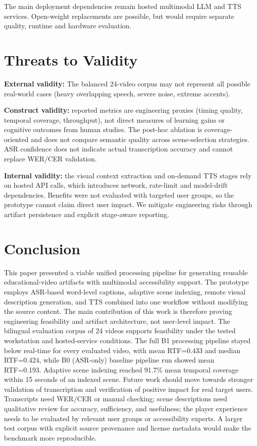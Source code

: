 ﻿\documentclass[conference]{IEEEtran}
\begin{document}
The main deployment dependencies remain hosted multimodal LLM and TTS services. Open-weight replacements are possible, but would require separate quality, runtime and hardware evaluation.

\section{Threats to Validity}
\textbf{External validity:} The balanced 24-video corpus may not represent all possible real-world cases (heavy overlapping speech, severe noise, extreme accents).

\textbf{Construct validity:} reported metrics are engineering proxies (timing quality, temporal coverage, throughput), not direct measures of learning gains or cognitive outcomes from human studies. The post-hoc ablation is coverage-oriented and does not compare semantic quality across scene-selection strategies. ASR confidence does not indicate actual transcription accuracy and cannot replace WER/CER validation.

\textbf{Internal validity:} the visual context extraction and on-demand TTS stages rely on hosted API calls, which introduces network, rate-limit and model-drift dependencies. Benefits were not evaluated with targeted user groups, so the prototype cannot claim direct user impact. We mitigate engineering risks through artifact persistence and explicit stage-aware reporting.

\section{Conclusion}
This paper presented a viable unified processing pipeline for generating reusable educational-video artifacts with multimodal accessibility support. The prototype employs ASR-based word-level captions, adaptive scene indexing, remote visual description generation, and TTS combined into one workflow without modifying the source content. The main contribution of this work is therefore proving engineering feasibility and artifact architecture, not user-level impact.
The bilingual evaluation corpus of 24 videos supports feasibility under the tested workstation and hosted-service conditions. The full B1 processing pipeline stayed below real-time for every evaluated video, with mean RTF=0.433 and median RTF=0.424, while B0 (ASR-only) baseline pipeline run showed mean RTF=0.193. Adaptive scene indexing reached 91.7\% mean temporal coverage within 15 seconds of an indexed scene.
Future work should move towards stronger validation of transcription and verification of positive impact for real target users. Transcripts need WER/CER or manual checking; scene descriptions need qualitative review for accuracy, sufficiency, and usefulness; the player experience needs to be evaluated by relevant user groups or accessibility experts. A larger test corpus with explicit source provenance and license metadata would make the benchmark more reproducible.



\end{document}
